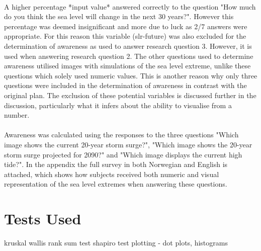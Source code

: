 \paragraph{}
  A higher percentage *input value* answered correctly to the question "How much do you think the sea level will change in the next 30 years?". However this percentage was deemed insignificant and more due to luck as 2/7 answers were appropriate. For this reason this variable (slr-future) was also excluded for the determination of awareness as used to answer research question 3. However, it is used when answering research question 2. The other questions used to determine awareness utilised images with simulations of the sea level extreme, unlike these questions which solely used numeric values. This is another reason why only three questions were included in the determination of awareness in contrast with the original plan. The exclusion of these potential variables is discussed further in the discussion, particularly what it infers about the ability to visualise from a number. 
\paragraph{}
Awareness was calculated using the responses to the three questions "Which image shows the current 20-year storm surge?", "Which image shows the 20-year storm surge projected for 2090?" and "Which image displays the current high tide?". In the appendix the full survey in both Norwegian and English is attached, which shows how subjects received both numeric and visual representation of the sea level extremes when answering these questions. 

\section{Tests Used}
kruskal wallis rank sum test
shapiro test
plotting - dot plots, histograms


